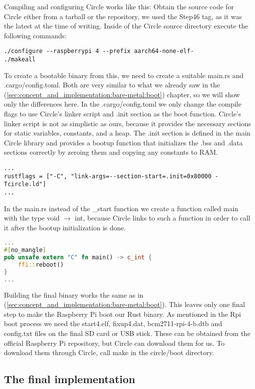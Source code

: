 Compiling and configuring Circle works like this:
Obtain the source code for Circle either from a tarball or the repository, we used the Step46 tag, as it was the latest at the time of writing.
Inside of the Circle source directory execute the following commands:
\begin{verbatim}
./configure --raspberrypi 4 --prefix aarch64-none-elf-
./makeall
\end{verbatim}

To create a bootable binary from this, we need to create a suitable main.rs and .cargo/config.toml.
Both are very similar to what we already saw in the  (\ref{sec:concept_and_implementation:bare-metal:boot}) chapter, so we will show only the differences here.
In the .cargo/config.toml we only change the compile flags to use Circle's linker script and .init section as the boot function.
Circle's linker script is not as simplistic as ours, because it provides the necessary sections for static variables, constants, and a heap.
The .init section is defined in the main Circle library and provides a bootup function that initializes the .bss and .data sections correctly by zeroing them and copying any constants to RAM.
\begin{verbatim}
...
rustflags = ["-C", "link-args=--section-start=.init=0x80000 -Tcircle.ld"]
...
\end{verbatim}

In the main.rs instead of the \_start function we create a function called main with the type void $\rightarrow$ int,
because Circle links to such a function in order to call it after the bootup initialization is done.
\begin{lstlisting}[language=Rust,style=colouredRust]
...
#[no_mangle]
pub unsafe extern "C" fn main() -> c_int {
    ffi::reboot()
}
...
\end{lstlisting}

Building the final binary works the same as in  (\ref{sec:concept_and_implementation:bare-metal:boot}).
This leaves only one final step to make the Raspberry Pi boot our Rust binary.
As mentioned in the Rpi boot process we need the start4.elf, fixup4.dat, bcm2711-rpi-4-b.dtb and config.txt files on the final SD card or USB stick.
These can be obtained from the official Raspberry Pi repository, but Circle can download them for us.
To download them through Circle, call make in the circle/boot directory.

\subsection{The final implementation}
\label{sec:concept_and_implementation:bare-metal:implementation}

